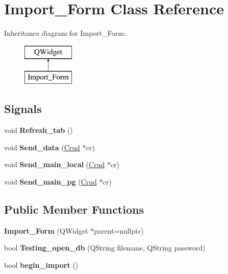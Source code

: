 \hypertarget{class_import___form}{}\section{Import\+\_\+\+Form Class Reference}
\label{class_import___form}
Inheritance diagram for Import\+\_\+\+Form\+:\begin{figure}[H]
\begin{center}
\leavevmode
\includegraphics[height=2.000000cm]{class_import___form}
\end{center}
\end{figure}
\subsection*{Signals}
\begin{DoxyCompactItemize}
\item 
\mbox{\label{class_import___form_a8f461e53aad63e433c2f42fe75546caa}} 
void {\bfseries Refresh\+\_\+tab} ()
\item 
\mbox{\label{class_import___form_a9caa693cca790d03686f1553f8ed6212}} 
void {\bfseries Send\+\_\+data} (\mbox{\hyperlink{class_crud}{Crud}} $\ast$cr)
\item 
\mbox{\label{class_import___form_aede5e2659be82b8b33b928986b1967dc}} 
void {\bfseries Send\+\_\+main\+\_\+local} (\mbox{\hyperlink{class_crud}{Crud}} $\ast$cr)
\item 
\mbox{\label{class_import___form_a89a7d1b81777b8b1efa066766048304d}} 
void {\bfseries Send\+\_\+main\+\_\+pg} (\mbox{\hyperlink{class_crud}{Crud}} $\ast$cr)
\end{DoxyCompactItemize}
\subsection*{Public Member Functions}
\begin{DoxyCompactItemize}
\item 
\mbox{\label{class_import___form_ab4583e4636adf6937e2eeddb5362e646}} 
{\bfseries Import\+\_\+\+Form} (Q\+Widget $\ast$parent=nullptr)
\item 
\mbox{\label{class_import___form_a60df3628f4d03713c44980fef4661d56}} 
bool {\bfseries Testing\+\_\+open\+\_\+db} (Q\+String filename, Q\+String password)
\item 
\mbox{\label{class_import___form_a73ffc9cc016b3e9a2bbb11f2c7b728c3}} 
bool {\bfseries begin\+\_\+import} ()
\end{DoxyCompactItemize}
